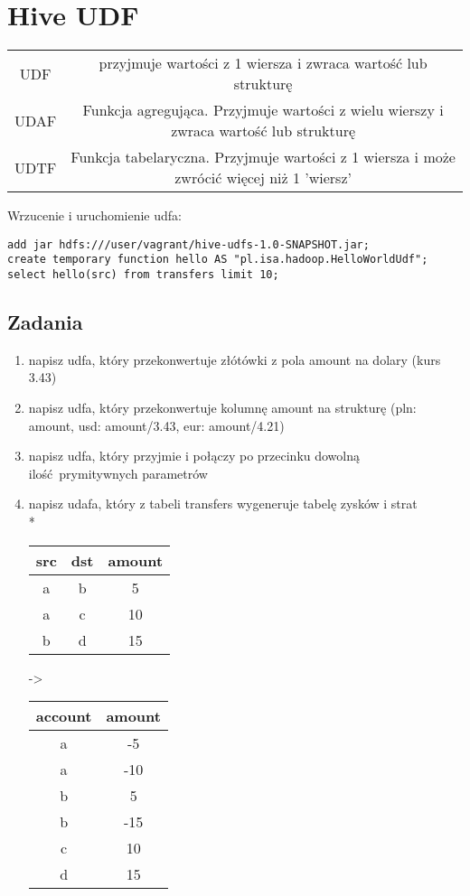 \documentclass{article}
\begin{document}
\section*{Hive UDF}

\begin{tabular}{c | c }
	UDF & przyjmuje wartości z 1 wiersza i zwraca wartość lub strukturę \\
	UDAF & Funkcja agregująca. Przyjmuje wartości z wielu wierszy i zwraca wartość lub strukturę \\
	UDTF & Funkcja tabelaryczna. Przyjmuje wartości z 1 wiersza i może zwrócić więcej niż 1 'wiersz' \\
\end{tabular}

\bigskip


Wrzucenie i uruchomienie udfa:
\begin{lstlisting}
add jar hdfs:///user/vagrant/hive-udfs-1.0-SNAPSHOT.jar;
create temporary function hello AS "pl.isa.hadoop.HelloWorldUdf";
select hello(src) from transfers limit 10;
\end{lstlisting}

\subsection*{Zadania}

\begin{enumerate}
\item napisz udfa, który przekonwertuje złótówki z pola amount na dolary (kurs 3.43)
\item napisz udfa, który przekonwertuje kolumnę amount na strukturę (pln: amount, usd: amount/3.43, eur: amount/4.21)
\item napisz udfa, który przyjmie i połączy po przecinku dowolną ilość prymitywnych parametrów
\item napisz udafa, który z tabeli transfers wygeneruje tabelę zysków i strat
\\*
\begin{tabular}{c | c | c }
	src & dst & amount \\ \hline 
	a & b & 5 \\
	a & c & 10 \\
	b & d & 15 \\
\end{tabular}
->
\begin{tabular}{c | c}
	account & amount \\ \hline 
	a & -5 \\
	a & -10 \\
	b & 5 \\
	b & -15 \\
	c & 10 \\
	d & 15 \\
\end{tabular}
\end{enumerate}
\end{document}
